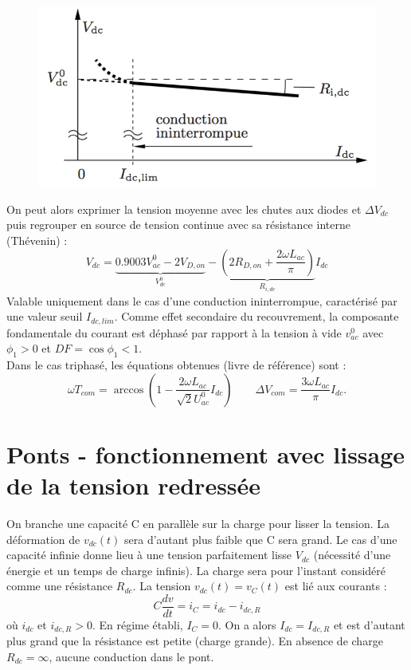 		\begin{figure}
		\vspace{-5mm}
		\includegraphics[scale=0.3]{ch2/13}
		\end{figure} 
		On peut alors exprimer la tension moyenne avec les chutes aux diodes et $\Delta V_{dc}$ puis regrouper en source de tension continue avec sa résistance interne (Thévenin) : 
		\begin{equation}
			V_{dc} = \underbrace{0.9003 V_{ac}^0 - 2V_{D,on}}_{V_{dc}^0} - \underbrace{\left( 2 R_{D,on} + \frac{2\omega L_{ac}}{\pi} \right)}_{R_{i,dc}} I_{dc}
		\end{equation}		 
		Valable uniquement dans le cas d'une conduction ininterrompue, caractérisé par une valeur seuil $I_{dc,lim}$. Comme effet secondaire du recouvrement, la composante fondamentale du courant est déphasé par rapport à la tension à vide $v_{ac}^0$ avec $\phi _1 >0$ et $DF = \cos \phi _1 < 1$. \\
		
		Dans le cas triphasé, les équations obtenues (livre de référence) sont : 
		\begin{equation}
			\omega T_{com} = \arccos \left( 1-\frac{2\omega L_{ac}}{\sqrt{2}U_{ac}^0} I_{dc}\right) \qquad \Delta V_{com} = \frac{3\omega L_{ac}}{\pi} I_{dc}.
		\end{equation}
		
\section{Ponts - fonctionnement avec lissage de la tension redressée}
	On branche une capacité C en parallèle sur la charge pour lisser la tension. La déformation de $v_{dc}(t)$ sera d'autant plus faible que C sera grand. Le cas d'une capacité infinie donne lieu à une tension parfaitement lisse $V_{dc}$ (nécessité d'une énergie et un temps de charge infinis). La charge sera pour l'instant considéré comme une résistance $R_{dc}$. La tension $v_{dc}(t) = v_C(t)$ est lié aux courants :
	\begin{equation}
		C\frac{dv}{dt} = i_C = i_{dc} - i_{dc,R}
		\label{eq:2.22}
	\end{equation}
	où $i_{dc}$ et $i_{dc,R} > 0$. En régime établi, $I_C = 0$. On a alors $I_{dc} = I_{dc,R}$ et est d'autant plus grand que la résistance est petite (charge grande). En absence de charge $R_{dc}=\infty$, aucune conduction dans le pont. 
	
